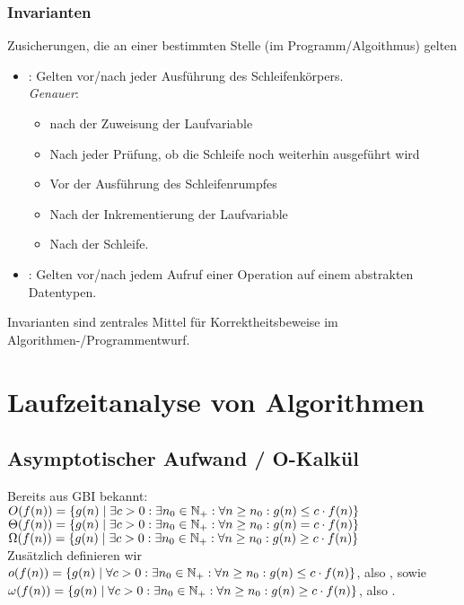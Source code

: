 \subsubsection{Invarianten}
Zusicherungen, die an einer bestimmten Stelle (im Programm/Algoithmus) gelten
\begin{itemize}
    \item {}: Gelten vor/nach jeder Ausführung des Schleifenkörpers.
    \\\textit{Genauer}:
    \begin{itemize}
        \item nach der Zuweisung der Laufvariable
        \item Nach jeder Prüfung, ob die Schleife noch weiterhin ausgeführt wird
        \item Vor der Ausführung des Schleifenrumpfes
        \item Nach der Inkrementierung der Laufvariable
        \item Nach der Schleife.
    \end{itemize}
    \item {}: Gelten vor/nach jedem Aufruf einer Operation auf einem abstrakten Datentypen.
\end{itemize}
Invarianten sind zentrales Mittel für Korrektheitsbeweise im Algorithmen-/Programmentwurf.

\newpage
\section{Laufzeitanalyse von Algorithmen}
\subsection{Asymptotischer Aufwand / O-Kalkül}
Bereits aus GBI bekannt:\\
$O(f(n))=\{g(n)\mid\exists c > 0: \exists n_0\in\mathbb{N_+}:\forall n \geq n_0:g(n)\leq c\cdot f(n)\}$\\
$\Theta(f(n))=\{g(n)\mid\exists c > 0: \exists n_0\in\mathbb{N_+}:\forall n \geq n_0:g(n)= c\cdot f(n)\}$\\
$\Omega(f(n))=\{g(n)\mid\exists c > 0: \exists n_0\in\mathbb{N_+}:\forall n \geq n_0:g(n)\geq c\cdot f(n)\}$\\
Zusätzlich definieren wir \\
$o(f(n))=\{g(n)\mid\forall c > 0: \exists n_0\in\mathbb{N_+}:\forall n \geq n_0:g(n)\leq c\cdot f(n)\}$, also , sowie\\
$\omega(f(n))=\{g(n)\mid\forall c > 0: \exists n_0\in\mathbb{N_+}:\forall n \geq n_0:g(n)\geq c\cdot f(n)\}$, also  .
